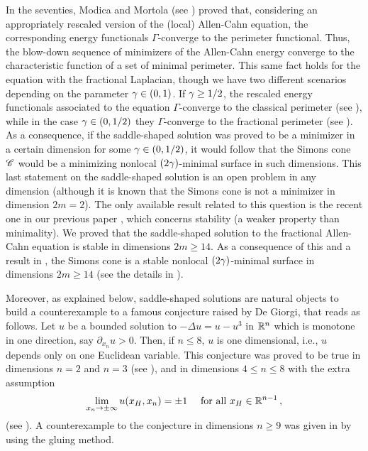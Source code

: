 In the seventies, Modica and Mortola (see \cite{Modica,ModicaMortola}) proved that, considering an appropriately rescaled version of the (local) Allen-Cahn equation, the corresponding energy functionals $\Gamma$-converge to the perimeter functional. Thus, the blow-down sequence of minimizers of the Allen-Cahn energy converge to the characteristic function of a set of minimal perimeter. This same fact holds for the equation with the fractional Laplacian, though we have two different scenarios depending on the parameter $\gamma \in (0,1)$. If $\gamma \geq 1/2$, the rescaled energy functionals associated to the equation $\Gamma$-converge to the classical perimeter (see \cite{GiovanniBouchitteSeppecher,Gonzalez}), while in the case $\gamma \in (0,1/2)$ they $\Gamma$-converge to the fractional perimeter (see \cite{SavinValdinoci-GammaConvergence}). As a consequence, if the saddle-shaped solution was proved to be a minimizer in a certain dimension for some $\gamma \in (0,1/2)$, it would follow that the Simons cone $\mathscr{C}$ would be a minimizing nonlocal $(2\gamma)$-minimal surface in such dimensions. This last statement on the saddle-shaped solution is an open problem in any dimension (although it is known that the Simons cone is not a minimizer in dimension $2m=2$). The only available result related to this question is the recent one in our previous paper \cite{Felipe-Sanz-Perela:SaddleFractional}, which concerns stability (a weaker property than minimality). We proved that the saddle-shaped solution to the fractional Allen-Cahn equation is stable in dimensions $2m\geq 14$. As a consequence of this and a result in \cite{CabreCintiSerra-Stable}, the Simons cone is a stable nonlocal $(2\gamma)$-minimal surface in dimensions $ 2m\geq 14$ (see the details in \cite{Felipe-Sanz-Perela:SaddleFractional}).


Moreover, as explained below, saddle-shaped solutions are natural objects to build a counterexample to a famous conjecture raised by De Giorgi, that reads as follows. Let $u$ be a bounded solution to $-\Delta  u = u - u^3$ in $\mathbb{R}^n$ which is monotone in one direction, say $\partial_{x_n} u > 0$. Then, if $n\leq 8$, $u$ is one dimensional, i.e., $u$ depends only on one Euclidean variable. This conjecture was proved to be true in dimensions $n=2$ and  $n=3$ (see \cite{GhoussoubGui,AmbrosioCabre}), and in dimensions $4\leq n \leq 8$ with the extra assumption
\begin{equation}
\label{Eq:SavinCondition}
\lim_{x_n \to \pm \infty} u(x_H,x_n) = \pm 1 \quad \text{ for all } x_H\in \mathbb{R}^{n-1}\,,
\end{equation}
(see \cite{Savin-DeGiorgi}). A counterexample to the conjecture in dimensions $n\geq 9$ was given in \cite{delPinoKowalczykWei} by using the gluing method. 

